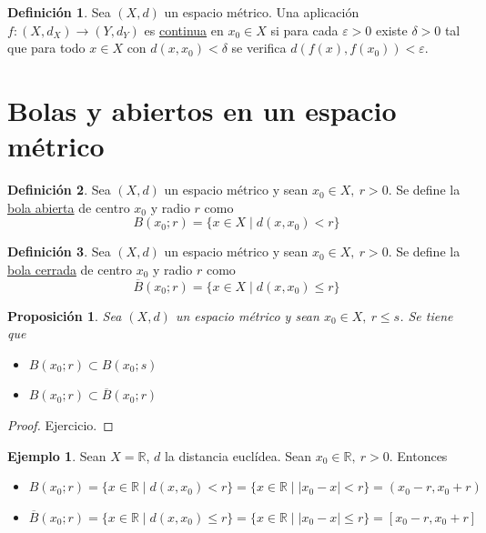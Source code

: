 \documentclass[12pt]{report}
\newtheorem{proposition}{Proposición}[chapter]
\theoremstyle{definition}
\newtheorem{definition}{Definición}[chapter]
\theoremstyle{definition}
\newtheorem{example}{Ejemplo}[chapter]
\theoremstyle{remark}
\newcommand{\R}{\mathbb R}
\begin{document}
\begin{definition}
Sea $(X,d)$ un espacio métrico. Una aplicación $f \colon (X,d_X) \to (Y,d_Y)$ es \underline{continua} en $x_0 \in X$ si para cada $\varepsilon > 0$ existe $\delta > 0$ tal que para todo $x \in X$ con $d(x,x_0) < \delta$ se verifica $d(f(x),f(x_0)) < \varepsilon$.
\end{definition}

\section{Bolas y abiertos en un espacio métrico}

\begin{definition}
Sea $(X,d)$ un espacio métrico y sean $x_0 \in X, \ r > 0$. Se define la \underline{bola abierta} de centro $x_0$ y radio $r$ como
\[B(x_0;r) = \{x \in X \mid d(x,x_0) < r\}\]
\end{definition}

\begin{definition}
Sea $(X,d)$ un espacio métrico y sean $x_0 \in X, \ r > 0$. Se define la \underline{bola cerrada} de centro $x_0$ y radio $r$ como
\[\overline{B}(x_0;r) = \{x \in X \mid d(x,x_0) \leq r\}\]
\end{definition}

\begin{proposition}
Sea $(X,d)$ un espacio métrico y sean $x_0 \in X, \ r \leq s$. Se tiene que 
\begin{itemize}
    \item[(i)] $B(x_0;r) \subset B(x_0;s)$
    \item[(ii)] $B(x_0;r) \subset \overline{B}(x_0;r)$
\end{itemize}
\end{proposition}

\begin{proof}
Ejercicio.
\end{proof}

\begin{example}
Sean $X = \R$, $d$ la distancia euclídea. Sean $x_0 \in \R, \ r > 0$. Entonces
\begin{itemize}
    \item $B(x_0;r) = \{x \in \R \mid d(x,x_0) < r\} = \{x \in \R \mid |x_0 - x| < r\} = (x_0-r,x_0+r)$
    \item $\overline{B}(x_0;r) = \{x \in \R \mid d(x,x_0) \leq r\} = \{x \in \R \mid |x_0 - x| \leq r\} = [x_0-r,x_0+r]$
\end{itemize}
\end{example}
\end{document}
